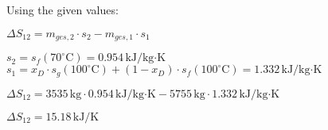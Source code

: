 Using the given values:  

\( \Delta S_{12} = m_{ges,2} \cdot s_2 - m_{ges,1} \cdot s_1 \)  

\( s_2 = s_f (70^\circ \text{C}) = 0.954 \, \text{kJ/kg·K} \)  
\( s_1 = x_D \cdot s_g (100^\circ \text{C}) + (1 - x_D) \cdot s_f (100^\circ \text{C}) = 1.332 \, \text{kJ/kg·K} \)  

\( \Delta S_{12} = 3535 \, \text{kg} \cdot 0.954 \, \text{kJ/kg·K} - 5755 \, \text{kg} \cdot 1.332 \, \text{kJ/kg·K} \)  

\( \Delta S_{12} = 15.18 \, \text{kJ/K} \)